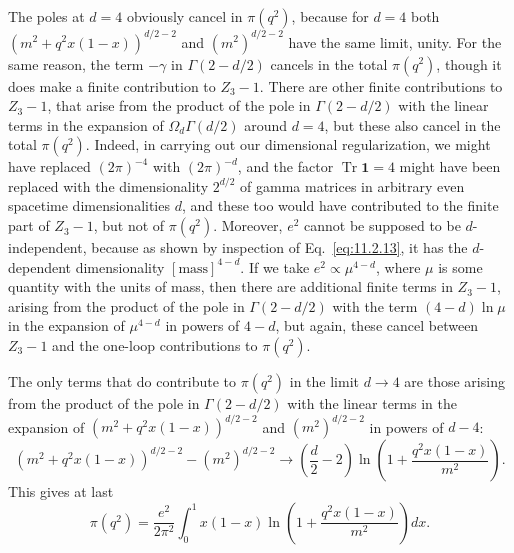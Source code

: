 The poles at $d=4$ obviously cancel in $\pi(q^2)$, because for $d=4$ both
$(m^2+q^2x(1-x))^{d/2-2}$ and $(m^2)^{d/2-2}$ have the same limit,
unity. For the same reason, the term $-\gamma$ in $\Gamma(2-d/2)$ cancels
in the total $\pi(q^2)$, though it does make a finite contribution to
$Z_3-1$. There are other finite contributions to $Z_3-1$, that arise from
the product of the pole in $\Gamma(2-d/2)$ with the linear terms in the
expansion of $\Omega_d\Gamma(d/2)$ around $d=4$, but these also cancel in
the total $\pi(q^2)$. Indeed, in carrying out our dimensional regularization,
we might have replaced $(2\pi)^{-4}$ with $(2\pi)^{-d}$, and the factor
$\operatorname{Tr}\mathbf{1}=4$ might have been replaced with the dimensionality
$2^{d/2}$ of gamma matrices in arbitrary even spacetime dimensionalities
$d$, and these too would have contributed to the finite part of $Z_3-1$,
but not of $\pi(q^2)$. Moreover, $e^2$ cannot be supposed to be
$d$-independent, because as shown by inspection of Eq.~\eqref{eq:11.2.13}, it has
the $d$-dependent dimensionality $[\text{mass}]^{4-d}$. If we take
$e^2\propto\mu^{4-d}$, where $\mu$ is some quantity with the units of mass,
then there are additional finite terms in $Z_3-1$, arising from the product
of the pole in $\Gamma(2-d/2)$ with the term $(4-d)\ln\mu$ in the
expansion of $\mu^{4-d}$ in powers of $4-d$, but again, these cancel between
$Z_3-1$ and the one-loop contributions to $\pi(q^2)$.

The only terms that do contribute to $\pi(q^2)$ in the limit $d\to4$ are
those arising from the product of the pole in $\Gamma(2-d/2)$ with the
linear terms in the expansion of $(m^2+q^2x(1-x))^{d/2-2}$ and
$(m^2)^{d/2-2}$ in powers of $d-4$:
\begin{equation}
  (m^2+q^2x(1-x))^{d/2-2}-(m^2)^{d/2-2}
  \longrightarrow\left(\frac d2-2\right)
  \ln\left(1+\frac{q^2x(1-x)}{m^2}\right).
  \tag{11.2.21}\label{eq:11.2.21}
\end{equation}
This gives at last
\begin{equation}
  \pi(q^2)=\frac{e^2}{2\pi^2}\int_0^1x(1-x)
  \ln\left(1+\frac{q^2x(1-x)}{m^2}\right)dx.
  \tag{11.2.22}\label{eq:11.2.22}
\end{equation}

